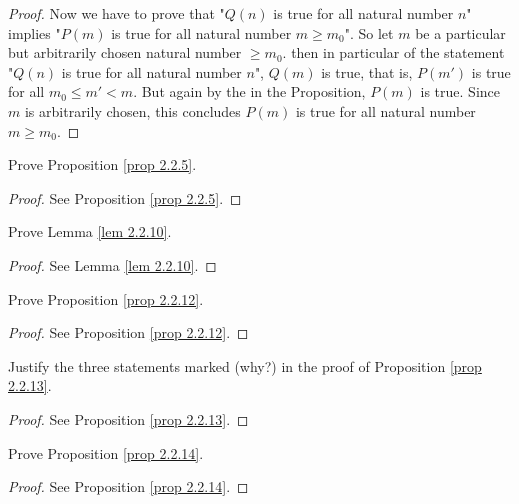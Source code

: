 \begin{proof}
Now we have to prove that "\(Q(n)\) is true for all natural number \(n\)" implies "\(P(m)\) is true for all natural number \(m \geq m_0\)". So let \(m\) be a particular but arbitrarily chosen natural number \(\geq m_0\). then in particular of the statement "\(Q(n)\) is true for all natural number \(n\)", \(Q(m)\) is true, that is, \(P(m')\) is true for all \(m_0 \leq m' < m\). But again by the  in the Proposition, \(P(m)\) is true. Since \(m\) is arbitrarily chosen, this concludes \(P(m)\) is true for all natural number \(m \geq m_0\).
\end{proof}

\exercisesection

\begin{exercise}\label{exercise 2.2.1}
    Prove Proposition \ref{prop 2.2.5}.
\end{exercise}
\begin{proof}
    See Proposition \ref{prop 2.2.5}.
\end{proof}

\begin{exercise}\label{exercise 2.2.2}
    Prove Lemma \ref{lem 2.2.10}.
\end{exercise}
\begin{proof}
    See Lemma \ref{lem 2.2.10}.
\end{proof}

\begin{exercise}\label{exercise 2.2.3}
    Prove Proposition \ref{prop 2.2.12}.
\end{exercise}
\begin{proof}
    See Proposition \ref{prop 2.2.12}.
\end{proof}

\begin{exercise}\label{exercise 2.2.4}
    Justify the three statements marked (why?) in the proof of Proposition \ref{prop 2.2.13}.
\end{exercise}
\begin{proof}
    See Proposition \ref{prop 2.2.13}.
\end{proof}

\begin{exercise}\label{exercise 2.2.5}
    Prove Proposition \ref{prop 2.2.14}.
\end{exercise}
\begin{proof}
    See Proposition \ref{prop 2.2.14}.
\end{proof}

